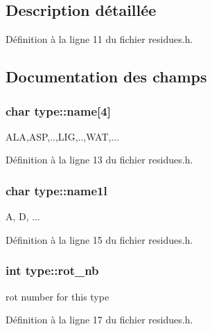 \subsection{Description détaillée}


Définition à la ligne 11 du fichier residues.\+h.



\subsection{Documentation des champs}
\hypertarget{structtype_aa47b79d5b3cf71b3d56a69c115ac1d51}{
\subsubsection[{name}]{\setlength{\rightskip}{0pt plus 5cm}char type\+::name\mbox{[}4\mbox{]}}}\label{structtype_aa47b79d5b3cf71b3d56a69c115ac1d51}


A\+L\+A,A\+S\+P,..,L\+I\+G,..,W\+A\+T,... 



Définition à la ligne 13 du fichier residues.\+h.

\hypertarget{structtype_a98deeb1d3000d9cdb5982023978bdce2}{
\subsubsection[{name1l}]{\setlength{\rightskip}{0pt plus 5cm}char type\+::name1l}}\label{structtype_a98deeb1d3000d9cdb5982023978bdce2}


A, D, ... 



Définition à la ligne 15 du fichier residues.\+h.

\hypertarget{structtype_affc66df9e7fed7164c85d598352fbef7}{
\subsubsection[{rot\+\_\+nb}]{\setlength{\rightskip}{0pt plus 5cm}int type\+::rot\+\_\+nb}}\label{structtype_affc66df9e7fed7164c85d598352fbef7}


rot number for this type 



Définition à la ligne 17 du fichier residues.\+h.

